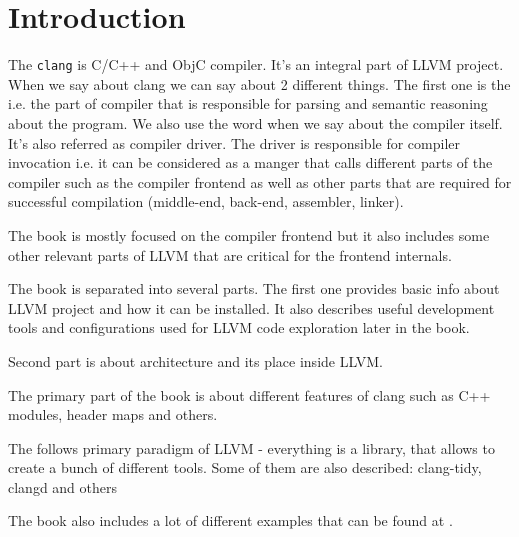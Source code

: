 \chapter{Introduction}

The \texttt{clang} is C/C++ and ObjC compiler. It's an
integral part of LLVM 
project. When we say about clang we can say about 2 different
things. The first one is the  i.e. the part of
compiler that is responsible for parsing and semantic reasoning about
the program. We also use the word \clang when we say
about the compiler itself. It's also referred as compiler driver. The
driver is responsible for compiler invocation i.e. it can be
considered as a manger that calls different parts of the
compiler such as the compiler
frontend as well as other parts that are required for successful
compilation (middle-end, back-end, assembler, linker).

The book is mostly focused on the \clang compiler
frontend but it also includes some other relevant parts of
LLVM that are critical for the frontend internals.

The book is separated into several parts. The first one provides basic
info about LLVM project and how it can be installed. It also describes
useful development tools and configurations used for LLVM code
exploration later in the book.

Second part is about \clang architecture and its
place inside LLVM.

The primary part of the book is about different features of clang such as C++
modules, header maps and others.

The \clang follows primary paradigm of LLVM -
everything is a library, that allows to create a bunch of different
tools. Some of them are also described: clang-tidy, clangd and others

The book also includes a lot of different examples that can be found at
\cite{github:clangbook_src}.
